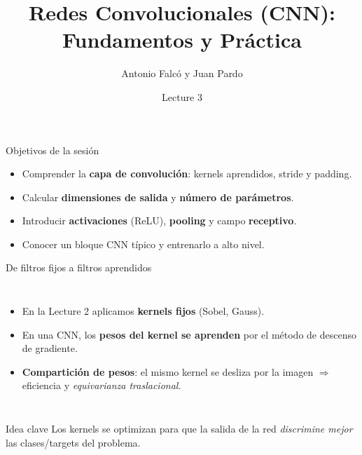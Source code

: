 \documentclass[10pt]{beamer}
\title{Redes Convolucionales (CNN): Fundamentos y Pr\'actica}
\author{Antonio Falc\'o y Juan Pardo}
\institute{Introducci\'on a la Inteligencia Artificial}
\date{Lecture 3}
\begin{document}
\begin{frame}
  \titlepage
\end{frame}

\begin{frame}{Objetivos de la sesi\'on}
\begin{itemize}
  \item Comprender la \textbf{capa de convoluci\'on}: kernels aprendidos, stride y padding.
  \item Calcular \textbf{dimensiones de salida} y \textbf{n\'umero de par\'ametros}.
  \item Introducir \textbf{activaciones} (ReLU), \textbf{pooling} y campo \textbf{receptivo}.
  \item Conocer un bloque CNN t\'ipico y entrenarlo a alto nivel.
\end{itemize}
\end{frame}

\begin{frame}{De filtros fijos a filtros aprendidos}
\begin{columns}
\begin{itemize}
  \item En la Lecture 2 aplicamos \textbf{kernels fijos} (Sobel, Gauss).
  \item En una CNN, los \textbf{pesos del kernel se aprenden} por el método de descenso de gradiente.
  \item \textbf{Compartici\'on de pesos}: el mismo kernel se desliza por la imagen $\Rightarrow $ eficiencia y \emph{equivarianza traslacional}.
\end{itemize}
\centering
{}
\end{columns}
\vspace{2mm}
\begin{block}{Idea clave}
Los kernels se optimizan para que la salida de la red \emph{discrimine mejor} las clases/targets del problema.
\end{block}
\end{frame}
\end{document}
